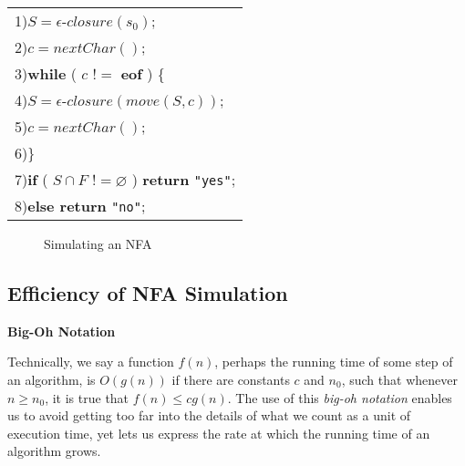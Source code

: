 \documentclass[a4paper,twoside]{book}
\begin{document}

\begin{center}
    \begin{tabular}{l}
        1)\quad$S=\epsilon$-$closure(s_0)$;\\
        2)\quad$c=nextChar()$;\\
        3)\quad\textbf{while} ( $c$ !$=$ \textbf{eof} ) \{\\
        4)\quad\qquad$S=\epsilon$-$closure(move(S,c))$;\\
        5)\quad\qquad$c=nextChar()$;\\
        6)\quad\}\\
        7)\quad\textbf{if} ( $S\cap F$ !$=\varnothing$ ) \textbf{return} \verb|"yes"|;\\
        8)\quad\textbf{else return} \verb|"no"|;
    \end{tabular}
\end{center}
\begin{figure}[htbp]
    \caption{Simulating an NFA}
    \label{Figure:3.37}
\end{figure}

\subsection{Efficiency of NFA Simulation}

\begin{framed}
    \begin{center}
        \textbf{{\large Big-Oh Notation}}
    \end{center}

    Technically, we say a function $f(n)$, perhaps the running time of some step of an algorithm, is $O(g(n))$  if there are constants $c$ and $n_0$, such that whenever $n\ge n_0$, it is true that $f(n)\le cg(n)$. The use of this \textit{big-oh notation} enables us to avoid getting too far into the details of what we count as a unit of execution time, yet lets us express the rate at which the running time of an algorithm grows.
\end{framed}
\end{document}
